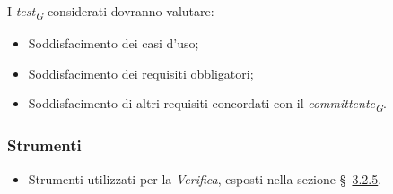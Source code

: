 I \textit{test}\textsubscript{\textit{G}} considerati dovranno valutare: 
\begin{itemize}
    \item 
        Soddisfacimento dei casi d’uso;
    \item 
        Soddisfacimento dei requisiti obbligatori;
    \item 
        Soddisfacimento di altri requisiti concordati con il \textit{committente}\textsubscript{\textit{G}}.
\end{itemize}

\subsubsection{Strumenti}
\begin{itemize}
    \item 
        Strumenti utilizzati per la \textit{Verifica}, esposti nella sezione \S~\hyperlink{subsubsec:strumentiVerifica}{3.2.5}.
\end{itemize}
